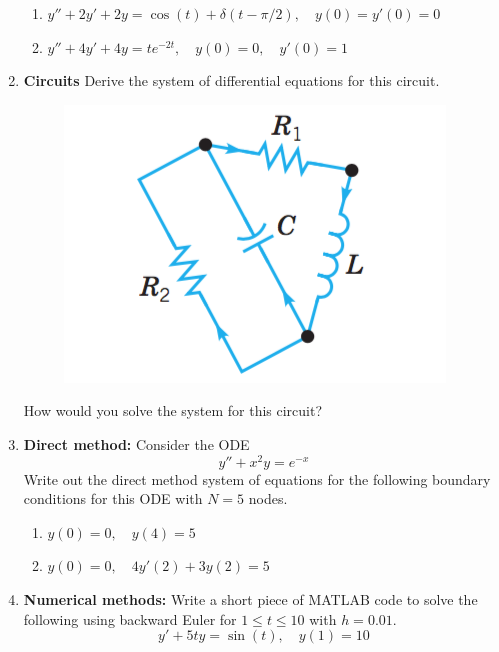\documentclass[letterpaper, fontsize=11pt]{scrartcl} %
\numberwithin{equation}{section} %
\numberwithin{figure}{section} %
\numberwithin{table}{section} %
\begin{document}
\begin{enumerate}
\begin{enumerate}
\item $y'' +2y' +2y=\cos(t)+\delta(t-\pi/2),\quad y(0) = y'(0) = 0$

\item $y'' + 4y' + 4y = te^{-2t},\quad y(0) = 0, \quad y'(0) = 1$

\end{enumerate}

\item \textbf{Circuits} Derive the system of differential equations for this circuit.

\begin{figure}[h]
\centering \includegraphics[width = 0.4\columnwidth]{finalReview2.png}
\end{figure}
How would you solve the system for this circuit? 

%
%
%

\item \textbf{Direct method:} Consider the ODE
\[ y'' + x^2y = e^{-x}\]
Write out the direct method system of equations for the following boundary conditions for this ODE with $N=5$ nodes.
\begin{enumerate}

\item $y(0) = 0, \quad y(4) = 5$

\item $y(0) = 0, \quad 4y'(2) +  3y(2)= 5$

\end{enumerate}

\item \textbf{Numerical methods:} Write a short piece of MATLAB code to solve the following using backward Euler for $1 \leq t \leq 10$ with $h = 0.01$.
\[ y' + 5ty = \sin(t), \quad y(1) = 10\]

\end{enumerate}

\end{document}
